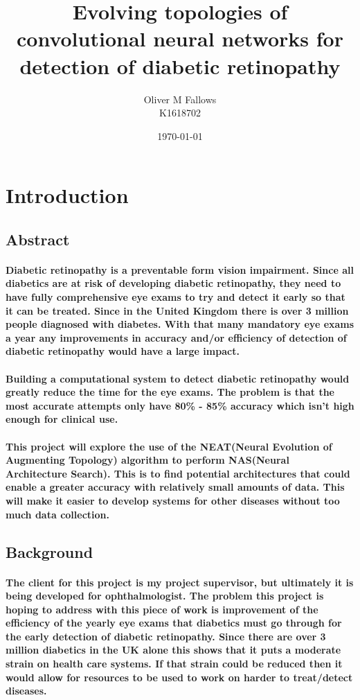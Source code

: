 \documentclass[a4paper,12pt]{article}
\begin{document}
\title{Evolving topologies of convolutional neural networks for detection of diabetic retinopathy}
\author{Oliver M Fallows\\K1618702}
\date{\today}
\maketitle
\newpage
{}
\tableofcontents
\newpage

\section{Introduction}
\subsection{Abstract}
\paragraph{Diabetic retinopathy is a preventable form vision impairment. Since all diabetics are at risk of developing diabetic retinopathy, they need to have fully comprehensive eye exams to try and detect it early so that it can be treated. Since in the United Kingdom there is over 3 million people diagnosed with diabetes. With that many mandatory eye exams a year any improvements in accuracy and/or efficiency of detection of diabetic retinopathy would have a large impact.}
\paragraph{Building a computational system to detect diabetic retinopathy would greatly reduce the time for the eye exams. The problem is that the most accurate attempts only have 80\% - 85\% accuracy which isn’t high enough for clinical use.}
\paragraph{This project will explore the use of the NEAT(Neural Evolution of Augmenting Topology) algorithm to perform NAS(Neural Architecture Search). This is to find potential architectures that could enable a greater accuracy with relatively small amounts of data. This will make it easier to develop systems for other diseases without too much data collection.}
\subsection{Background}
\paragraph{The client for this project is my project supervisor, but ultimately it is being developed for ophthalmologist. The problem this project is hoping to address with this piece of work is improvement of the efficiency of the yearly eye exams that diabetics must go through for the early detection of diabetic retinopathy. Since there are over 3 million diabetics in the UK alone this shows that it puts a moderate strain on health care systems. If that strain could be reduced then it would allow for resources to be used to work on harder to treat/detect diseases.}
\end{document}
